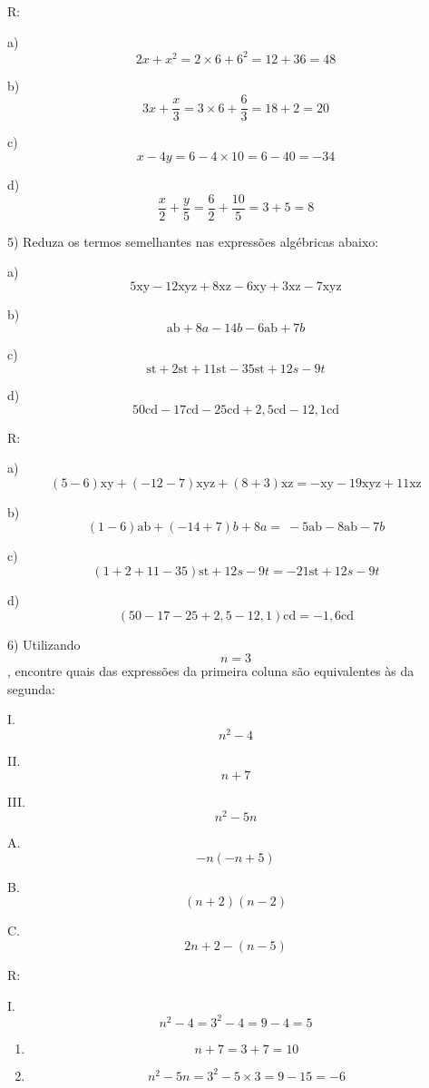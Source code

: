 R:

a) \[2x + x^{2} = 2 \times 6 + 6^{2} = 12 + 36 = 48\]

b) \[3x + \frac{x}{3} = 3 \times 6 + \frac{6}{3} = 18 + 2 = 20\]

c) \[x - 4y = 6 - 4 \times 10 = 6 - 40 = - 34\]

d)
\[\frac{x}{2} + \frac{y}{5} = \frac{6}{2} + \frac{10}{5} = 3 + 5 = 8\]

5) Reduza os termos semelhantes nas expressões algébricas abaixo:

a)
\[5\text{xy} - 12\text{xyz} + 8\text{xz} - 6\text{xy} + 3\text{xz} - 7\text{xyz}\]

b) \[\text{ab} + 8a - 14b - 6\text{ab} + 7b\]

c) \[\text{st} + 2\text{st} + 11\text{st} - 35\text{st} + 12s - 9t\]

d)
\[50\text{cd} - 17\text{cd} - 25\text{cd} + 2,5\text{cd} - 12,1\text{cd}\]

R:

a)
\[\left( 5 - 6 \right)\text{xy} + \left( - 12 - 7 \right)\text{xyz} + \left( 8 + 3 \right)\text{xz} = - \text{xy} - 19\text{xyz} + 11\text{xz}\]

b)
\[\left( 1 - 6 \right)\text{ab} + \left( - 14 + 7 \right)b + 8a = \  - 5\text{ab} - 8\text{ab} - 7b\]

c)
\[\left( 1 + 2 + 11 - 35 \right)\text{st} + 12s - 9t = - 21\text{st} + 12s - 9t\]

d)
\[\left( 50 - 17 - 25 + 2,5 - 12,1 \right)\text{cd} = - 1,6\text{cd}\]

6) Utilizando \[n = 3\], encontre quais das expressões da primeira
coluna são equivalentes às da segunda:

I. \[n^{2} - 4\]

II. \[n + 7\]

III. \[n^{2} - 5n\]

A. \[- n( - n + 5)\]

B. \[(n + 2)(n - 2)\]

C. \[2n + 2 - (n - 5)\]

R:

I. \[n^{2} - 4 = 3^{2} - 4 = 9 - 4 = 5\]

\begin{enumerate}
\def\labelenumi{\Roman{enumi}.}
\setcounter{enumi}{1}
\item
  \[n + 7 = 3 + 7 = 10\]
\item
  \[n^{2} - 5n = 3^{2} - 5 \times 3 = 9 - 15 = - 6\]
\end{enumerate}


